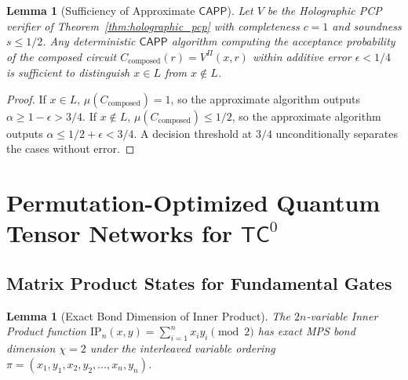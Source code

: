 \documentclass[11pt,letterpaper]{article}
\newtheorem{lemma}[theorem]{Lemma}
\newcommand{\TC}{\mathsf{TC}}
\newcommand{\CAPP}{\mathsf{CAPP}}
\newcommand{\eps}{\epsilon}
\begin{document}
\begin{lemma}[Sufficiency of Approximate $\CAPP$]
\label{lem:approx_capp_sufficient}
Let $V$ be the Holographic PCP verifier of Theorem~\ref{thm:holographic_pcp} with completeness $c = 1$ and soundness $s \le 1/2$. Any deterministic $\CAPP$ algorithm computing the acceptance probability of the composed circuit $C_{\text{composed}}(r) = V^{\Pi}(x, r)$ within additive error $\eps < 1/4$ is sufficient to distinguish $x \in L$ from $x \notin L$.
\end{lemma}

\begin{proof}
If $x \in L$, $\mu(C_{\text{composed}}) = 1$, so the approximate algorithm outputs $\alpha \ge 1 - \eps > 3/4$. If $x \notin L$, $\mu(C_{\text{composed}}) \le 1/2$, so the approximate algorithm outputs $\alpha \le 1/2 + \eps < 3/4$. A decision threshold at $3/4$ unconditionally separates the cases without error.
\end{proof}

\section{Permutation-Optimized Quantum Tensor Networks for $\TC^0$}

\subsection{Matrix Product States for Fundamental Gates}

\begin{lemma}[Exact Bond Dimension of Inner Product]
\label{lem:ip_bond}
The $2n$-variable Inner Product function $\mathrm{IP}_n(x,y) = \sum_{i=1}^n x_i y_i \pmod 2$ has exact MPS bond dimension $\chi = 2$ under the interleaved variable ordering $\pi = (x_1, y_1, x_2, y_2, \dots, x_n, y_n)$.
\end{lemma}
\end{document}
